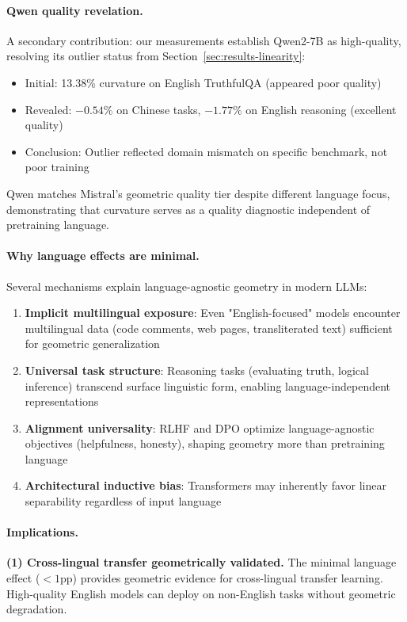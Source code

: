 \documentclass[11pt]{article}
\begin{document}
\paragraph{Qwen quality revelation.}
A secondary contribution: our measurements establish Qwen2-7B as high-quality, resolving its outlier status from Section~\ref{sec:results-linearity}:
\begin{itemize}
\item Initial: 13.38\% curvature on English TruthfulQA (appeared poor quality)
\item Revealed: $-0.54\%$ on Chinese tasks, $-1.77\%$ on English reasoning (excellent quality)
\item Conclusion: Outlier reflected domain mismatch on specific benchmark, not poor training
\end{itemize}

Qwen matches Mistral's geometric quality tier despite different language focus, demonstrating that curvature serves as a quality diagnostic independent of pretraining language.

\paragraph{Why language effects are minimal.}
Several mechanisms explain language-agnostic geometry in modern LLMs:
\begin{enumerate}
\item \textbf{Implicit multilingual exposure}: Even "English-focused" models encounter multilingual data (code comments, web pages, transliterated text) sufficient for geometric generalization
\item \textbf{Universal task structure}: Reasoning tasks (evaluating truth, logical inference) transcend surface linguistic form, enabling language-independent representations  
\item \textbf{Alignment universality}: RLHF and DPO optimize language-agnostic objectives (helpfulness, honesty), shaping geometry more than pretraining language
\item \textbf{Architectural inductive bias}: Transformers may inherently favor linear separability regardless of input language
\end{enumerate}

\paragraph{Implications.}
\textbf{(1) Cross-lingual transfer geometrically validated.} The minimal language effect ($<1$pp) provides geometric evidence for cross-lingual transfer learning. High-quality English models can deploy on non-English tasks without geometric degradation.
\end{document}
